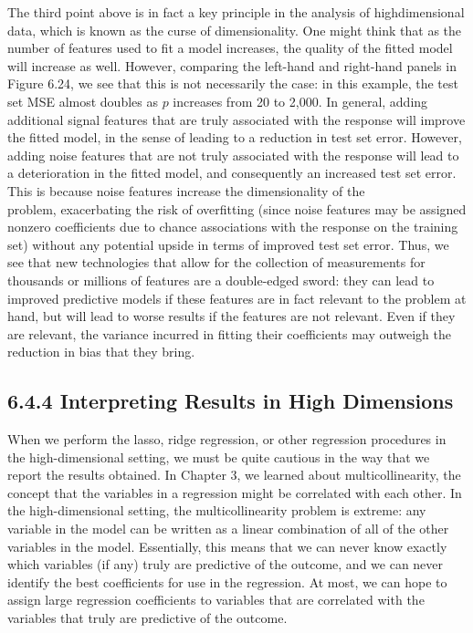 \documentclass[10pt]{article}
\begin{document}
The third point above is in fact a key principle in the analysis of highdimensional data, which is known as the curse of dimensionality. One might think that as the number of features used to fit a model increases, the quality of the fitted model will increase as well. However, comparing the left-hand and right-hand panels in Figure 6.24, we see that this is not necessarily the case: in this example, the test set MSE almost doubles as $p$ increases from 20 to 2,000. In general, adding additional signal features that are truly associated with the response will improve the fitted model, in the sense of leading to a reduction in test set error. However, adding noise features that are not truly associated with the response will lead to a deterioration in the fitted model, and consequently an increased test set error. This is because noise features increase the dimensionality of the\\
problem, exacerbating the risk of overfitting (since noise features may be assigned nonzero coefficients due to chance associations with the response on the training set) without any potential upside in terms of improved test set error. Thus, we see that new technologies that allow for the collection of measurements for thousands or millions of features are a double-edged sword: they can lead to improved predictive models if these features are in fact relevant to the problem at hand, but will lead to worse results if the features are not relevant. Even if they are relevant, the variance incurred in fitting their coefficients may outweigh the reduction in bias that they bring.

\subsection*{6.4.4 Interpreting Results in High Dimensions}
When we perform the lasso, ridge regression, or other regression procedures in the high-dimensional setting, we must be quite cautious in the way that we report the results obtained. In Chapter 3, we learned about multicollinearity, the concept that the variables in a regression might be correlated with each other. In the high-dimensional setting, the multicollinearity problem is extreme: any variable in the model can be written as a linear combination of all of the other variables in the model. Essentially, this means that we can never know exactly which variables (if any) truly are predictive of the outcome, and we can never identify the best coefficients for use in the regression. At most, we can hope to assign large regression coefficients to variables that are correlated with the variables that truly are predictive of the outcome.
\end{document}
